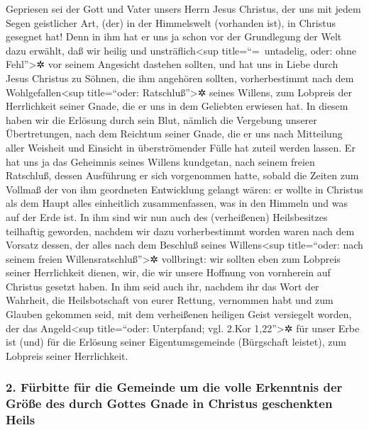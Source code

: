  Gepriesen sei der Gott und Vater unsers Herrn Jesus
Christus, der uns mit jedem Segen geistlicher Art, (der) in der
Himmelswelt (vorhanden ist), in Christus gesegnet hat! 
Denn in ihm hat er uns ja schon vor der Grundlegung der Welt dazu
erwählt, daß wir heilig und unsträflich\textless sup
title=``=~untadelig, oder: ohne Fehl''\textgreater✲ vor seinem Angesicht
dastehen sollten,  und hat uns in Liebe durch Jesus
Christus zu Söhnen, die ihm angehören sollten, vorherbestimmt nach dem
Wohlgefallen\textless sup title=``oder: Ratschluß''\textgreater✲ seines
Willens,  zum Lobpreis der Herrlichkeit seiner Gnade, die
er uns in dem Geliebten erwiesen hat.  In diesem haben wir
die Erlösung durch sein Blut, nämlich die Vergebung unserer
Übertretungen, nach dem Reichtum seiner Gnade,  die er uns
nach Mitteilung aller Weisheit und Einsicht in überströmender Fülle hat
zuteil werden lassen.  Er hat uns ja das Geheimnis seines
Willens kundgetan, nach seinem freien Ratschluß, dessen Ausführung er
sich vorgenommen hatte,  sobald die Zeiten zum Vollmaß
der von ihm geordneten Entwicklung gelangt wären: er wollte in Christus
als dem Haupt alles einheitlich zusammenfassen, was in den Himmeln und
was auf der Erde ist.  In ihm sind wir nun auch des
(verheißenen) Heilsbesitzes teilhaftig geworden, nachdem wir dazu
vorherbestimmt worden waren nach dem Vorsatz dessen, der alles nach dem
Beschluß seines Willens\textless sup title=``oder: nach seinem freien
Willensratschluß''\textgreater✲ vollbringt:  wir sollten
eben zum Lobpreis seiner Herrlichkeit dienen, wir, die wir unsere
Hoffnung von vornherein auf Christus gesetzt haben.  In
ihm seid auch ihr, nachdem ihr das Wort der Wahrheit, die Heilsbotschaft
von eurer Rettung, vernommen habt und zum Glauben gekommen seid, mit dem
verheißenen heiligen Geist versiegelt worden,  der das
Angeld\textless sup title=``oder: Unterpfand; vgl. 2.Kor
1,22''\textgreater✲ für unser Erbe ist (und) für die Erlösung seiner
Eigentumsgemeinde (Bürgschaft leistet), zum Lobpreis seiner
Herrlichkeit.

\hypertarget{fuxfcrbitte-fuxfcr-die-gemeinde-um-die-volle-erkenntnis-der-gruxf6uxdfe-des-durch-gottes-gnade-in-christus-geschenkten-heils}{%
\subsubsection{2. Fürbitte für die Gemeinde um die volle Erkenntnis der
Größe des durch Gottes Gnade in Christus geschenkten
Heils}\label{fuxfcrbitte-fuxfcr-die-gemeinde-um-die-volle-erkenntnis-der-gruxf6uxdfe-des-durch-gottes-gnade-in-christus-geschenkten-heils}}

